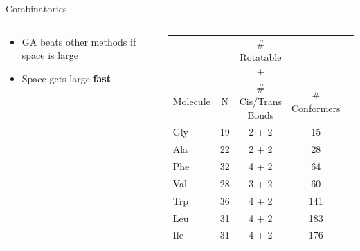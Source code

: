 \documentclass[10pt]{beamer}
\begin{document}
{{{%
\begin{frame}{Combinatorics}
	\begin{columns}[c] %
		\begin{column}{.3\textwidth}
			\begin{itemize}
				\item {GA beats other methods if space is large}
				\item {Space gets large \textbf{\alert{fast}}}
			\end{itemize}
		\end{column}
		\hfill
		\begin{column}{0.8\textwidth}
            \begin{tabular}{l c c c r}
                     &    & \# Rotatable +     &               \\
            Molecule & N  & \# Cis/Trans Bonds & \# Conformers \\
            \midrule
            Gly & 19 & 2 + 2 & 15  \\
            Ala & 22 & 2 + 2 & 28  \\
            Phe & 32 & 4 + 2 & 64  \\
            Val & 28 & 3 + 2 & 60  \\
            Trp & 36 & 4 + 2 & 141 \\
            Leu & 31 & 4 + 2 & 183 \\
            Ile & 31 & 4 + 2 & 176 \\
            \end{tabular}
		\end{column}
	\end{columns}
\end{frame}
}

{%
}}}
\end{document}
